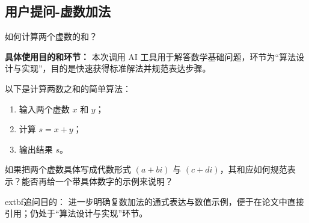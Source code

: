 \subsection{用户提问-虚数加法}
\begin{tcolorbox}[colback=orange!10, colframe=orange!60, title={\textcolor{black}{用户提问}}]
如何计算两个虚数的和？
\vspace{0.5em}
\begin{flushright}
    \scriptsize
    \begin{flushleft}
        \textbf{具体使用目的和环节：} 本次调用 AI 工具用于解答数学基础问题，环节为“算法设计与实现”，目的是快速获得标准解法并规范表达步骤。
    \end{flushleft}
\end{flushright}
\end{tcolorbox}


\begin{GeminiBlock}
以下是计算两数之和的简单算法：
\begin{enumerate}
    \item 输入两个虚数 $x$ 和 $y$；
    \item 计算 $s = x + y$；
    \item 输出结果 $s$。
\end{enumerate}
\end{GeminiBlock}

\begin{tcolorbox}[colback=orange!10, colframe=orange!60, title={\textcolor{black}{用户追问}}]
如果把两个虚数具体写成代数形式 $(a+bi)$ 与 $(c+di)$，其和应如何规范表示？能否再给一个带具体数字的示例来说明？
\vspace{0.5em}
\begin{flushright}
    \scriptsize
    \begin{flushleft}
        	extbf{追问目的：} 进一步明确复数加法的通式表达与数值示例，便于在论文中直接引用；仍处于“算法设计与实现”环节。
    \end{flushleft}
\end{flushright}
\end{tcolorbox}

